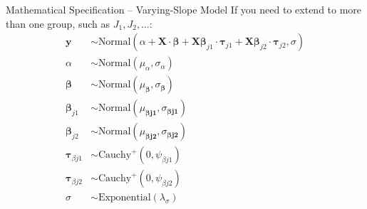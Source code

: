 \begin{frame}{Mathematical Specification -- Varying-Slope Model}
	If you need to extend to more than one group,
	such as $J_1, J_2, \dots$:
	$$
		\begin{aligned}
			\mathbf{y}                   & \sim \text{Normal}(\alpha + \mathbf{X} \cdot \boldsymbol{\beta} + \mathbf{X} \boldsymbol{\beta}_{j1} \cdot \boldsymbol{\tau}_{j1} + \mathbf{X} \boldsymbol{\beta}_{j2} \cdot \boldsymbol{\tau}_{j2}, \sigma) \\
			\alpha                       & \sim \text{Normal}(\mu_\alpha, \sigma_\alpha)                                                                                                                                                                \\
			\boldsymbol{\beta}           & \sim \text{Normal}(\mu_{\boldsymbol{\beta}}, \sigma_{\boldsymbol{\beta}})                                                                                                                                    \\
			\boldsymbol{\beta}_{j1}      & \sim \text{Normal}(\mu_{\boldsymbol{\beta j1}}, \sigma_{\boldsymbol{\beta j1}})                                                                                                                              \\
			\boldsymbol{\beta}_{j2}      & \sim \text{Normal}(\mu_{\boldsymbol{\beta j2}}, \sigma_{\boldsymbol{\beta j2}})                                                                                                                              \\
			\boldsymbol{\tau}_{\beta j1} & \sim \text{Cauchy}^+(0, \psi_{\beta j1})                                                                                                                                                                     \\
			\boldsymbol{\tau}_{\beta j2} & \sim \text{Cauchy}^+(0, \psi_{\beta j2})                                                                                                                                                                     \\
			\sigma                       & \sim \text{Exponential}(\lambda_\sigma)
		\end{aligned}
	$$
\end{frame}

